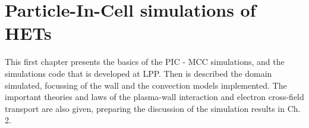 
\chapter{Particle-In-Cell simulations of HETs}
\label{ch-1}

\begin{Chabstract}
  
This first chapter presents the basics of the \ac{PIC} - \ac{MCC} simulations, and the simulations code \LPPic that is developed at \ac{LPP}.
Then is described the domain simulated, focussing of the wall and the convection models implemented.
The important theories and laws of the plasma-wall interaction and electron cross-field transport are also given, preparing the discussion of the simulation results in Ch. 2.

\end{Chabstract}
\minitoc


 











